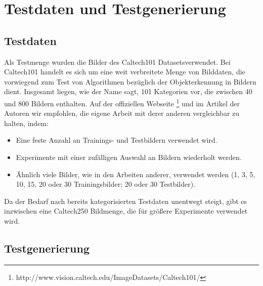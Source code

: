 \section{Testdaten und Testgenerierung}

\subsection{Testdaten}

Als Testmenge wurden die Bilder des Caltech101 \glqq Datasets\grqq verwendet. Bei Caltech101 handelt es sich um eine weit verbreitete Menge von Bilddaten, die vorwiegend zum Test von Algorithmen bezüglich der Objekterkennung in Bildern dient. Insgesamt liegen, wie der Name sagt, 101 Kategorien vor, die zwischen 40 und 800 Bildern enthalten. Auf der offiziellen Webseite \footnote{http://www.vision.caltech.edu/Image\textunderscore Datasets/Caltech101/} und im Artikel der Autoren wir empfohlen, die eigene Arbeit mit derer anderen vergleichbar zu halten, indem:

\begin{itemize}
	\item Eine feste Anzahl an Trainings- und Testbildern verwendet wird.
	\item Experimente mit einer zufälligen Auswahl an Bildern wiederholt werden.
	\item Ähnlich viele Bilder, wie in den Arbeiten anderer, verwendet werden (1, 3, 5, 10, 15, 20 oder 30 Trainingsbilder; 20 oder 30 Testbilder).
\end{itemize}

Da der Bedarf nach bereits kategorisierten Testdaten unentwegt steigt, gibt es inzwischen eine Caltech250 Bildmenge, die für größere Experimente verwendet wird.

\subsection{Testgenerierung}

